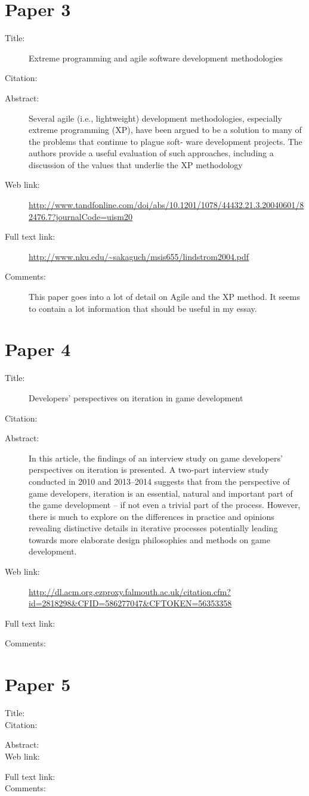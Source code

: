 \documentclass{scrartcl}
\begin{document}
\section*{Paper 3}
\begin{description}
	\item[Title:] Extreme programming and agile software development methodologies
	\item[Citation:] \cite{lindstrom2004extreme}
	\item[Abstract:] Several agile (i.e., lightweight) development methodologies, especially extreme programming 
	(XP), have been argued to be a solution to many of the problems that continue to plague soft-
	ware development projects. The authors provide a useful evaluation of such approaches, 
	including a discussion of the values that underlie the XP methodology
	\item[Web link:] \url{http://www.tandfonline.com/doi/abs/10.1201/1078/44432.21.3.20040601/82476.7?journalCode=uism20}
	\item[Full text link:] \url{http://www.nku.edu/~sakaguch/msis655/lindstrom2004.pdf}
	\item[Comments:]  This paper goes into a lot of detail on Agile and the XP method. It seems to contain a lot information that should be useful in my essay.
\end{description}

\section*{Paper 4}
\begin{description}
	\item[Title:] Developers' perspectives on iteration in game development
	\item[Citation:] \cite{Kultima}
	\item[Abstract:] In this article, the findings of an interview study on game developers' perspectives on iteration is presented. A two-part interview study conducted in 2010 and 2013--2014 suggests that from the perspective of game developers, iteration is an essential, natural and important part of the game development -- if not even a trivial part of the process. However, there is much to explore on the differences in practice and opinions revealing distinctive details in iterative processes potentially leading towards more elaborate design philosophies and methods on game development.
	\item[Web link:] \url{http://dl.acm.org.ezproxy.falmouth.ac.uk/citation.cfm?id=2818298&CFID=586277047&CFTOKEN=56353358}
	\item[Full text link:] \url{}
	\item[Comments:]  
\end{description}


\section*{Paper 5}
\begin{description}
	\item[Title:] 
	\item[Citation:] \cite{}
	\item[Abstract:] 
	\item[Web link:] \url{}
	\item[Full text link:]
	\item[Comments:]  
\end{description}



\end{document}
